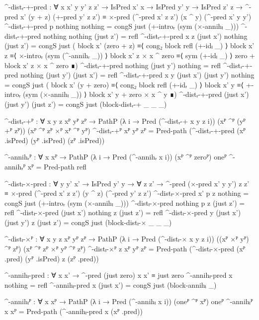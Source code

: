 \begin{code}[hide]
  ^-distᵣ-+-pred :
    ∀ {x x' y y' z z'} → IsPred x' x → IsPred y' y → IsPred z' z →
    ^-pred x' (y + z) (+-pred y' z z') ≡
    ×-pred (^-pred x' z z') (x ^ y) (^-pred x' y y')
  ^-distᵣ-+-pred p nothing nothing =
    congS just (+-introᵣ (sym (×-annihₗ _)))
  ^-distᵣ-+-pred nothing nothing (just z') = refl
  ^-distᵣ-+-pred {x} {z} (just x') nothing (just z') =
    congS just
      ( block x' (zero + z)          ≡⟨ cong₂ block refl (+-idₗ _) ⟩
        block x' z                   ≡⟨ ×-introᵣ (sym (^-annihᵣ _)) ⟩
        block x' z × x ^ zero        ≡⟨ sym (+-idₗ _) ⟩
        zero + block x' z × x ^ zero ∎)
  ^-distᵣ-+-pred nothing (just y') nothing = refl
  ^-distᵣ-+-pred nothing (just y') (just x') = refl
  ^-distᵣ-+-pred {x} {y} (just x') (just y') nothing =
    congS just
      ( block x' (y + zero)       ≡⟨ cong₂ block refl (+-idᵣ _) ⟩
        block x' y                ≡⟨ +-introᵣ (sym (×-annihₗ _)) ⟩
        block x' y + zero × x ^ y ∎)
  ^-distᵣ-+-pred (just x') (just y') (just z') =
    congS just (block-distᵣ-+ _ _ _)

  ^-distᵣ-+ᴾ :
    ∀ {x y z} xᴾ yᴾ zᴾ →
    PathP (λ i → Pred (^-distᵣ-+ x y z i))
      (xᴾ ^ᴾ (yᴾ +ᴾ zᴾ)) (xᴾ ^ᴾ zᴾ ×ᴾ xᴾ ^ᴾ yᴾ)
  ^-distᵣ-+ᴾ xᴾ yᴾ zᴾ =
    Pred-path (^-distᵣ-+-pred (xᴾ .isPred) (yᴾ .isPred) (zᴾ .isPred))

  ^-annihᵣᴾ : ∀ {x} xᴾ → PathP (λ i → Pred (^-annihᵣ x i)) (xᴾ ^ᴾ zeroᴾ) oneᴾ
  ^-annihᵣᴾ xᴾ = Pred-path refl

  ^-distₗ-×-pred :
    ∀ {y y'} x' → IsPred y' y → ∀ z z' →
    ^-pred (×-pred x' y y') z z' ≡
    ×-pred (^-pred x' z z') (y ^ z) (^-pred y' z z')
  ^-distₗ-×-pred x' p z nothing = congS just (+-introᵣ (sym (×-annihₗ _)))
  ^-distₗ-×-pred nothing p z (just z') = refl
  ^-distₗ-×-pred (just x') nothing z (just z') = refl
  ^-distₗ-×-pred {y} (just x') (just y') z (just z') =
    congS just (block-distₗ-× _ _ _)

  ^-distₗ-×ᴾ :
    ∀ {x y z} xᴾ yᴾ zᴾ →
    PathP (λ i → Pred (^-distₗ-× x y z i))
      ((xᴾ ×ᴾ yᴾ) ^ᴾ zᴾ) (xᴾ ^ᴾ zᴾ ×ᴾ yᴾ ^ᴾ zᴾ)
  ^-distₗ-×ᴾ {z} xᴾ yᴾ zᴾ =
    Pred-path (^-distₗ-×-pred (xᴾ .pred) (yᴾ .isPred) z (zᴾ .pred))

  ^-annihₗ-pred : ∀ x x' → ^-pred (just zero) x x' ≡ just zero
  ^-annihₗ-pred x nothing = refl
  ^-annihₗ-pred x (just x') = congS just (block-annihₗ _)

  ^-annihₗᴾ : ∀ {x} xᴾ → PathP (λ i → Pred (^-annihₗ x i)) (oneᴾ ^ᴾ xᴾ) oneᴾ
  ^-annihₗᴾ {x} xᴾ = Pred-path (^-annihₗ-pred x (xᴾ .pred))
\end{code}

